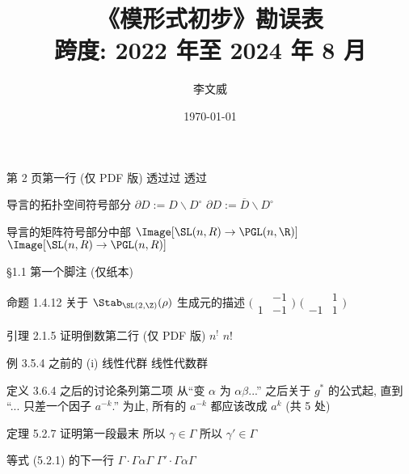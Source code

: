 \documentclass{AJerrata}
\title{\bfseries 《模形式初步》勘误表 \\ 跨度: 2022 年至 2024 年 8 月}
\author{李文威}
\date{\today}
\begin{document}
	\maketitle
	
	\begin{Errata}
		\item[第 2 页第一行 (仅 PDF 版)]
		\Orig 透过过
		\Corr 透过
		
		\item[导言的拓扑空间符号部分]
		\Orig $\partial D := D \smallsetminus D^\circ$
		\Corr $\partial D := \overline{D} \smallsetminus D^\circ$
		
		\item[导言的矩阵符号部分中部]
		\Orig $\Image[\SL(n, R) \to \PGL(n, \R)]$
		\Corr $\Image[\SL(n, R) \to \PGL(n, R)]$
		
		\item[\S 1.1 第一个脚注 (仅纸本)]
		\Orig [50]
		\Corr [59]
		
		\item[命题 1.4.12 关于 $\Stab_{\SL(2, \Z)}(\rho)$ 生成元的描述]
		\Orig $\bigl(\begin{smallmatrix} & -1 \\ 1 & -1 \end{smallmatrix}\bigr)$
		\Corr $\bigl(\begin{smallmatrix} & 1 \\ -1 & 1 \end{smallmatrix}\bigr)$
		
		\item[引理 2.1.5 证明倒数第二行 (仅 PDF 版)]
		\Orig $n^!$
		\Corr $n!$

		\item[例 3.5.4 之前的 (i)]
		\Orig 线性代群
		\Corr 线性代数群


		\item[定义 3.6.4 之后的讨论条列第二项]
		从``变 $\alpha$ 为 $\alpha\beta$...'' 之后关于 $g^*$ 的公式起, 直到 ``... 只差一个因子 $a^{-k}$.'' 为止, 所有的 $a^{-k}$ 都应该改成 $a^k$ (共 5 处)
		
		\item[定理 5.2.7 证明第一段最末]
		\Orig 所以 $\gamma \in \Gamma$
		\Corr 所以 $\gamma' \in \Gamma$
		
		\item[等式 (5.2.1) 的下一行]
		\Orig $\Gamma \cdot \Gamma \alpha \Gamma$
		\Corr $\Gamma' \cdot \Gamma \alpha \Gamma$
		

\end{Errata}
\end{document}
